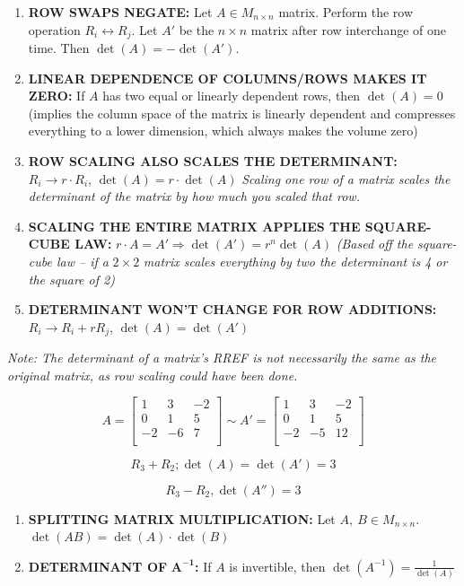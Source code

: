 \documentclass[
]{article}
\begin{document}
\begin{enumerate}
\def\labelenumi{\arabic{enumi}.}
\item
  \textbf{ROW SWAPS NEGATE:} Let $A \in M_{n \times n}$ matrix.
  Perform the row operation $R_{i} \leftrightarrow R_{j}$. Let $A'$
  be the $n \times n$ matrix after row interchange of one time. Then
  $\det(A) = - \det\left( A' \right)$.
\item
  \textbf{LINEAR DEPENDENCE OF COLUMNS/ROWS MAKES IT ZERO:} If $A$ has
  two equal or linearly dependent rows, then $\det(A) = 0$ (implies
  the column space of the matrix is linearly dependent and compresses
  everything to a lower dimension, which always makes the volume zero)
\item
  \textbf{ROW SCALING ALSO SCALES THE DETERMINANT:}
  $R_{i} \rightarrow r \cdot R_{i}$, $\det(A) = r \cdot \det(A)$
  \emph{Scaling one row of a matrix scales the determinant of the matrix
  by how much you scaled that row.}
\item
  \textbf{SCALING THE ENTIRE MATRIX APPLIES THE SQUARE-CUBE LAW:}
  $r \cdot A = A' \Rightarrow \det\left( A' \right) = r^{n}\det(A)$
  \emph{(Based off the square-cube law -- if a} $2 \times 2$
  \emph{matrix scales everything by two the determinant is 4 or the
  square of 2)}
\item
  \textbf{DETERMINANT WON'T CHANGE FOR ROW ADDITIONS:}
  $R_{i} \rightarrow R_{i} + rR_{j}$,
  $\det(A) = \det\left( A' \right)$
\end{enumerate}

\emph{Note: The determinant of a matrix's RREF is not necessarily the
same as the original matrix, as row scaling could have been done.}

$$A = \begin{bmatrix}
1 & 3 & - 2 \\
0 & 1 & 5 \\
 - 2 & - 6 & 7 \\
\end{bmatrix}\sim A' = \begin{bmatrix}
1 & 3 & - 2 \\
0 & 1 & 5 \\
 - 2 & - 5 & 12 \\
\end{bmatrix}$$

$$R_{3} + R_{2};\det(A) = \det\left( A' \right) = 3$$

$$R_{3} - R_{2},\det\left( A'' \right) = 3$$

\begin{enumerate}
\def\labelenumi{\arabic{enumi}.}
\setcounter{enumi}{5}
\item
  \textbf{SPLITTING MATRIX MULTIPLICATION:} Let
  $A,\ B \in M_{n \times n}$.
  $\det\left( AB \right) = \det(A) \cdot \det(B)$
\item
  \textbf{DETERMINANT OF} $\mathbf{A}^{\mathbf{- 1}}$\textbf{:} If
  $A$ is invertible, then
  $\det\left( A^{- 1} \right) = \frac{1}{\det(A)}$
\end{enumerate}
\end{document}
